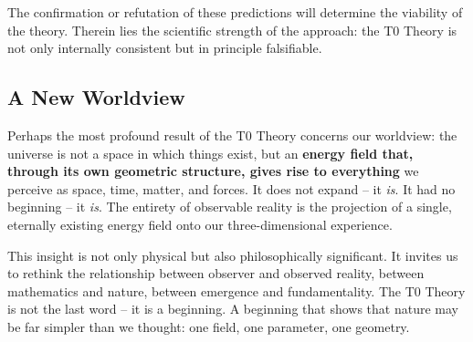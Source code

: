 \documentclass[11pt,oneside]{book}
\begin{document}
The confirmation or refutation of these predictions will determine the viability of the theory. Therein lies the scientific strength of the approach: the T0 Theory is not only internally consistent but in principle falsifiable.

\subsection*{A New Worldview}

Perhaps the most profound result of the T0 Theory concerns our worldview: the universe is not a space in which things exist, but an \textbf{energy field that, through its own geometric structure, gives rise to everything} we perceive as space, time, matter, and forces. It does not expand -- it \textit{is}. It had no beginning -- it \textit{is}. The entirety of observable reality is the projection of a single, eternally existing energy field onto our three-dimensional experience.

This insight is not only physical but also philosophically significant. It invites us to rethink the relationship between observer and observed reality, between mathematics and nature, between emergence and fundamentality. The T0 Theory is not the last word -- it is a beginning. A beginning that shows that nature may be far simpler than we thought: one field, one parameter, one geometry.
\end{document}
